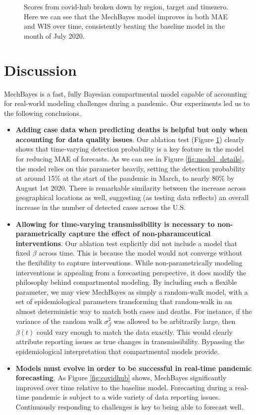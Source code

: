 \documentclass[11pt]{amsart}
\begin{document}
\begin{figure}
\caption{Scores from covid-hub broken down by region, target and timezero. Here we can see that the MechBayes model improves in both MAE and WIS over time, consistently beating the baseline model in the month of July 2020.  }
\label{fig:ablation}
\end{figure}




\section{Discussion}

MechBayes is a fast, fully Bayesian compartmental model capable of accounting for real-world modeling challenges during a pandemic. Our experiments led us to the following conclusions.

\begin{itemize}
\item \textbf{Adding case data when predicting deaths is helpful but only when accounting for data quality issues}. Our ablation test (Figure \ref{fig:ablation}) clearly shows that time-varying detection probability is a key feature in the model for reducing MAE of forecasts. As we can see in Figure \ref{fig:model_details}, the model relies on this parameter heavily, setting the detection probability at around 15\% at the start of the pandemic in March, to nearly 80\% by August 1st 2020. There is remarkable similarity between the increase across geographical locations as well, suggesting (as testing data reflects) an overall increase in the number of detected cases across the U.S. 

\item \textbf{Allowing for time-varying transmissibility is necessary to non-parametrically capture the effect of non-pharamceutical interventions}. Our ablation test explicitly did not include a model that fixed $\beta$ across time. This is because the model would not converge without the flexibility to capture interventions. While non-parametrically modeling interventions is appealing from a forecasting perspective, it does modify the philosophy behind compartmental modeling. By including such a flexible parameter, we may view MechBayes as simply a random-walk model, with a set of epidemiological parameters transforming that random-walk in an almost deterministic way to match both cases and deaths. For instance, if the variance of the random walk $\sigma_{\beta}^2$ was allowed to be arbitrarily large, then $\beta(t)$ could vary enough to match the data exactly. This would clearly attribute reporting issues as true changes in transmissibility. Bypassing the epidemiological interpretation that compartmental models provide. 

\item \textbf{Models must evolve in order to be successful in real-time pandemic forecasting}. As Figure \ref{fig:covidhub} shows, MechBayes significantly improved over time relative to the baseline model. Forecasting during a real-time pandemic is subject to a wide variety of data reporting issues. Continuously responding to challenges is key to being able to forecast well. 



\end{itemize}
\end{document}
